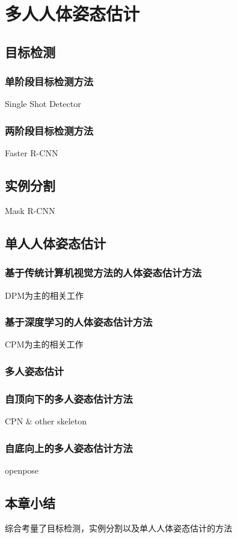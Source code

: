 \chapter{多人人体姿态估计}
\label{cha:related}

\section{目标检测}
\label{sec:detect}
\subsection{单阶段目标检测方法}
\label{subsec:1stagedetector}
Single Shot Detector
\subsection{两阶段目标检测方法}
\label{2stagedetector}
Faster R-CNN

\section{实例分割}
\label{sec:insseg}
Mask R-CNN

\section{单人人体姿态估计}
\label{sec:singlepose}
\subsection{基于传统计算机视觉方法的人体姿态估计方法}
\label{subsec:legacypose}
DPM为主的相关工作
\subsection{基于深度学习的人体姿态估计方法}
\label{subsec:deeppose}
CPM为主的相关工作

\subsection{多人姿态估计}
\label{sec:multipose}
\subsection{自顶向下的多人姿态估计方法}
\label{subsec:topdownpose}
CPN \& other skeleton
\subsection{自底向上的多人姿态估计方法}
\label{subsec:bottomuppose}
openpose

\section{本章小结}
综合考量了目标检测，实例分割以及单人人体姿态估计的方法

